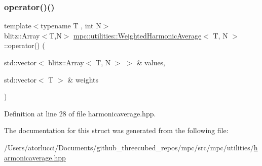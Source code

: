 \subsubsection{\texorpdfstring{operator()()}{operator()()}}
{\footnotesize\ttfamily template$<$typename T , int N$>$ \\
blitz\+::\+Array$<$T,N$>$ \mbox{\hyperlink{structmpc_1_1utilities_1_1_weighted_harmonic_average}{mpc\+::utilities\+::\+Weighted\+Harmonic\+Average}}$<$ T, N $>$\+::operator() (\begin{DoxyParamCaption}\item[{std\+::vector$<$ blitz\+::\+Array$<$ T, N $>$ $>$ \&}]{values,  }\item[{std\+::vector$<$ T $>$ \&}]{weights }\end{DoxyParamCaption})\hspace{0.3cm}{\ttfamily [inline]}}



Definition at line 28 of file harmonicaverage.\+hpp.



The documentation for this struct was generated from the following file\+:\begin{DoxyCompactItemize}
\item 
/\+Users/atorlucci/\+Documents/github\+\_\+threecubed\+\_\+repos/mpc/src/mpc/utilities/\mbox{\hyperlink{harmonicaverage_8hpp}{harmonicaverage.\+hpp}}\end{DoxyCompactItemize}
